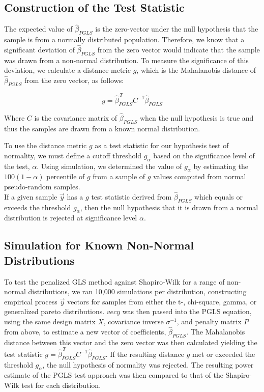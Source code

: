 \documentclass[12pt]{article}
\begin{document}
\subsection{Construction of the Test Statistic}

The expected value of $\hat{\beta}_{PGLS}$ is the zero-vector under the null hypothesis that the sample is from a normally distributed population. Therefore, we know that a significant deviation of $\hat{\beta}_{PGLS}$ from the zero vector would indicate that the sample was drawn from a non-normal distribution. To measure the significance of this deviation, we calculate a distance metric $g$, which is the Mahalanobis distance of $\hat{\beta}_{PGLS}$ from the zero vector, as follows: 

\begin{equation}
g=\hat{\beta}_{PGLS}^{\, T}C^{-1}\hat{\beta}_{PGLS}\label{eq23}
\end{equation}

Where $C$ is the covariance matrix of $\hat{\beta}_{PGLS}$  when the null hypothesis is true and thus the samples are drawn from a known normal distribution.

To use the distance metric $g$ as a test statistic for our hypothesis test of normality, we must define a cutoff threshold $g_{\alpha}$ based on the significance level of the test, $\alpha$. Using simulation, we determined the value of $g_{\alpha}$ by estimating the $100(1-\alpha)$ percentile of $g$ from a sample of $g$ values computed from normal pseudo-random samples.\\

If a given sample $\vec{y}$ has a $g$ test statistic derived from $\hat{\beta}_{PGLS}$ which equals or exceeds the threshold $g_{\alpha}$, then the null hypothesis that it is drawn from a normal distribution is rejected at significance level $\alpha$.

\subsection{Simulation for Known Non-Normal Distributions}

To test the penalized GLS method against Shapiro-Wilk for a range of non-normal distributions, we ran 10,000 simulations per distribution, constructing empirical process  $\vec{y}$ vectors for samples from either the t-, chi-square,  gamma, or generalized pareto distributions. $vec{y}$ was then passed into the PGLS equation, using the same design matrix $X$, covariance inverse $\sigma^{-1}$, and penalty matrix $P$ from above, to estimate a new vector of coefficients, $\hat{\beta}_{PGLS}$. The Mahalanobis distance between this vector  and the zero vector was then calculated yielding the test statistic $g=\hat{\beta}_{PGLS}^{\, T}C^{-1}\hat{\beta}_{PGLS}$. If the resulting distance $g$ met or exceeded the threshold $g_{\alpha}$, the null hypothesis of normality was rejected. The resulting power estimate of the PGLS test approach was then compared to that of the Shapiro-Wilk test for each distribution.
\end{document}
